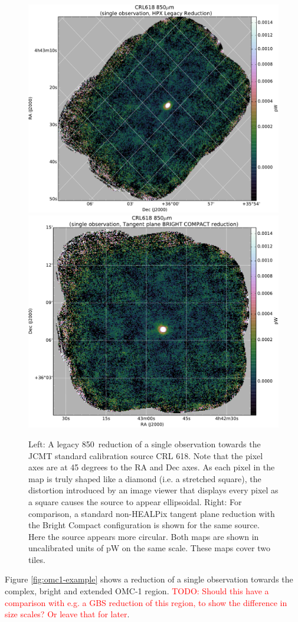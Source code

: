 \documentclass[twocolumn]{aastex6}
\newcommand{\um}{\micron}
\newcommand{\todo}[1]{\textcolor{red}{TODO: #1}}
\begin{document}
\begin{figure}
  \centering
  \includegraphics[width=0.45\linewidth]{crl618_example_legacyred}
  \includegraphics[width=0.45\linewidth]{crl618_example_bcred}
  \caption{Left: A legacy 850\,\um{} reduction of a single observation
    towards the JCMT standard calibration source CRL 618. Note that
    the pixel axes are at 45 degrees to the RA and Dec axes. As each
    pixel in the map is truly shaped like a diamond (i.e. a stretched
    square), the distortion introduced by an image viewer that
    displays every pixel as a square causes the source to appear
    ellipsoidal. Right: For comparison, a standard non-HEALPix tangent
    plane reduction with the Bright Compact configuration is shown for
    the same source. Here the source appears more circular. Both maps
    are shown in uncalibrated units of pW on the same scale. These
    maps cover two tiles.}
  \label{fig:crl618-example}
\end{figure}


Figure \ref{fig:omc1-example} shows a reduction of a single
observation towards the complex, bright and extended OMC-1
region. \todo{ Should this have a comparison with e.g. a GBS
  reduction of this region, to show the difference in size scales?
Or leave that for later}.
\end{document}
